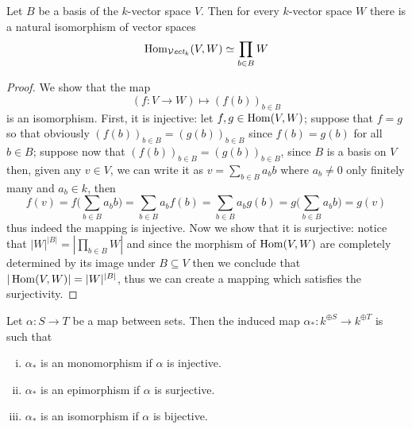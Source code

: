 \begin{proposition}
  Let \(B\) be a basis of the \(k\)-vector space \(V\). Then for every
  \(k\)-vector space \(W\) there is a natural isomorphism of vector spaces
  \[
    \operatorname{Hom}_{{\mathcal{V}\textit{ect}}_k}(V, W) \simeq \prod_{b \in B} W
  \]
\end{proposition}

\begin{proof}
  We show that the map
  \[
    (f: V \to W) \longmapsto (f(b))_{b \in B}
  \]
  is an isomorphism. First, it is injective: let \(f, g \in \operatorname{Hom}(V, W)\);
  suppose that \(f = g\) so that obviously \((f(b))_{b \in B} = (g(b))_{b \in
  B}\) since \(f(b) = g(b)\) for all \(b \in B\); suppose now that \((f(b))_{b
  \in B} = (g(b))_{b \in B}\), since \(B\) is a basis on \(V\) then, given any
  \(v \in V\), we can write it as \(v = \sum_{b \in B} a_b b\) where \(a_b \neq
  0\) only finitely many and \(a_b \in k\), then
  \[
    f(v) = f\bigg(\sum_{b \in B} a_b b\bigg) = \sum_{b \in B} a_b f(b)
    = \sum_{b \in B} a_b g(b) = g\bigg(\sum_{b \in B} a_b b\bigg) = g(v)
  \]
  thus indeed the mapping is injective. Now we show that it is surjective:
  notice that \(|W|^{|B|} = \left| \prod_{b \in B} W \right|\) and since the
  morphism of \(\operatorname{Hom}(V, W)\) are completely determined by its image under \(B
  \subseteq V\) then we conclude that \(|\operatorname{Hom}(V, W)| = |W|^{|B|}\), thus we can
  create a mapping which satisfies the surjectivity.
\end{proof}

\begin{proposition}
  Let \(\alpha : S \to T\) be a map between sets. Then the induced map
  \(\alpha_\ast : k^{\oplus S} \to k^{\oplus T}\) is such that
  \begin{enumerate}[i.]
    \item \(\alpha_\ast\) is an monomorphism if \(\alpha\) is injective.
    \item \(\alpha_\ast\) is an epimorphism if \(\alpha\) is surjective.
    \item \(\alpha_\ast\) is an isomorphism if \(\alpha\) is bijective.
  \end{enumerate}
\end{proposition}

